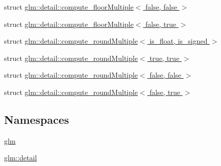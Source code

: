 \begin{DoxyCompactItemize}
\item 
struct \hyperlink{structglm_1_1detail_1_1compute__floor_multiple_3_01false_00_01false_01_4}{glm\+::detail\+::compute\+\_\+floor\+Multiple$<$ false, false $>$}
\item 
struct \hyperlink{structglm_1_1detail_1_1compute__floor_multiple_3_01false_00_01true_01_4}{glm\+::detail\+::compute\+\_\+floor\+Multiple$<$ false, true $>$}
\item 
struct \hyperlink{structglm_1_1detail_1_1compute__round_multiple}{glm\+::detail\+::compute\+\_\+round\+Multiple$<$ is\+\_\+float, is\+\_\+signed $>$}
\item 
struct \hyperlink{structglm_1_1detail_1_1compute__round_multiple_3_01true_00_01true_01_4}{glm\+::detail\+::compute\+\_\+round\+Multiple$<$ true, true $>$}
\item 
struct \hyperlink{structglm_1_1detail_1_1compute__round_multiple_3_01false_00_01false_01_4}{glm\+::detail\+::compute\+\_\+round\+Multiple$<$ false, false $>$}
\item 
struct \hyperlink{structglm_1_1detail_1_1compute__round_multiple_3_01false_00_01true_01_4}{glm\+::detail\+::compute\+\_\+round\+Multiple$<$ false, true $>$}
\end{DoxyCompactItemize}
\subsection*{Namespaces}
\begin{DoxyCompactItemize}
\item 
 \hyperlink{namespaceglm}{glm}
\item 
 \hyperlink{namespaceglm_1_1detail}{glm\+::detail}
\end{DoxyCompactItemize}
